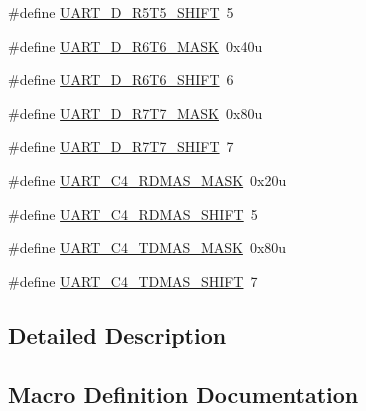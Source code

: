 \begin{DoxyCompactItemize}
\item 
\#define \hyperlink{group___u_a_r_t___register___masks_gae69f7102190028c0404e6ace547ae211}{U\+A\+R\+T\+\_\+\+D\+\_\+\+R5\+T5\+\_\+\+S\+H\+I\+FT}~5
\item 
\#define \hyperlink{group___u_a_r_t___register___masks_ga866bfef731e0bc24a2afd8d8131ba93a}{U\+A\+R\+T\+\_\+\+D\+\_\+\+R6\+T6\+\_\+\+M\+A\+SK}~0x40u
\item 
\#define \hyperlink{group___u_a_r_t___register___masks_ga2437f29b3af453c9abac355cc0f83f17}{U\+A\+R\+T\+\_\+\+D\+\_\+\+R6\+T6\+\_\+\+S\+H\+I\+FT}~6
\item 
\#define \hyperlink{group___u_a_r_t___register___masks_ga1f6a350925baddf74b5d3398c52b648f}{U\+A\+R\+T\+\_\+\+D\+\_\+\+R7\+T7\+\_\+\+M\+A\+SK}~0x80u
\item 
\#define \hyperlink{group___u_a_r_t___register___masks_gad2b538e10e336537f0adf3c63317bc69}{U\+A\+R\+T\+\_\+\+D\+\_\+\+R7\+T7\+\_\+\+S\+H\+I\+FT}~7
\item 
\#define \hyperlink{group___u_a_r_t___register___masks_ga51946763b696d9d65cc421b08995923a}{U\+A\+R\+T\+\_\+\+C4\+\_\+\+R\+D\+M\+A\+S\+\_\+\+M\+A\+SK}~0x20u
\item 
\#define \hyperlink{group___u_a_r_t___register___masks_ga4c44b0d9f3315d9fad52f1c2b9e2d347}{U\+A\+R\+T\+\_\+\+C4\+\_\+\+R\+D\+M\+A\+S\+\_\+\+S\+H\+I\+FT}~5
\item 
\#define \hyperlink{group___u_a_r_t___register___masks_gaddd38f2fce38e0a363744ab50071c471}{U\+A\+R\+T\+\_\+\+C4\+\_\+\+T\+D\+M\+A\+S\+\_\+\+M\+A\+SK}~0x80u
\item 
\#define \hyperlink{group___u_a_r_t___register___masks_ga60d9c5b3d3d01f52b013c8d22363ff24}{U\+A\+R\+T\+\_\+\+C4\+\_\+\+T\+D\+M\+A\+S\+\_\+\+S\+H\+I\+FT}~7
\end{DoxyCompactItemize}


\subsection{Detailed Description}


\subsection{Macro Definition Documentation}
\mbox{\label{group___u_a_r_t___register___masks_ga88fb29d1cb045a09e851a31c689ef60e}} 
